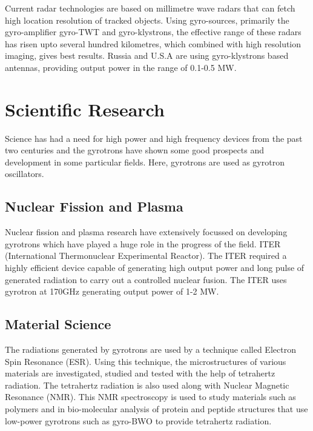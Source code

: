 Current radar technologies are based on millimetre wave radars that can fetch high location resolution of tracked objects. Using gyro-sources, primarily the gyro-amplifier gyro-TWT and gyro-klystrons, the effective range of these radars has risen upto several hundred kilometres, which combined with high resolution imaging, gives best results. Russia and U.S.A are using gyro-klystrons based antennas, providing output power in the range of 0.1-0.5 MW.

\section{Scientific Research}

Science has had a need for high power and high frequency devices from the past two centuries and the gyrotrons have shown some good prospects and development in some particular fields. Here, gyrotrons are used as gyrotron oscillators.

\subsection{Nuclear Fission and Plasma}
Nuclear fission and plasma research have extensively focussed on developing gyrotrons which have played a huge role in the progress of the field. ITER (International Thermonuclear Experimental Reactor). The ITER required a highly efficient device capable of generating high output power and long pulse of generated radiation to carry out a controlled nuclear fusion. The ITER uses gyrotron at 170GHz generating output power of 1-2 MW.

\subsection{Material Science}
The radiations generated by gyrotrons are used by a technique called Electron Spin Resonance (ESR). Using this technique, the microstructures of various materials are investigated, studied and tested with the help of tetrahertz radiation. The tetrahertz radiation is also used along with Nuclear Magnetic Resonance (NMR). This NMR spectroscopy is used to study materials such as polymers and in bio-molecular analysis of protein and peptide structures that use low-power gyrotrons such as gyro-BWO to provide tetrahertz radiation.


